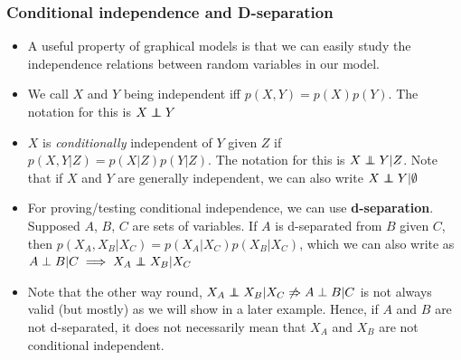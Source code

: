 \subsubsection{Conditional independence and D-separation}
\begin{itemize}
	\item A useful property of graphical models is that we can easily study the independence relations between random variables in our model. 
	\item We call $X$ and $Y$ being independent iff $p(X,Y)=p(X)p(Y)$. The notation for this is $X\independent Y$
	\item $X$ is \textit{conditionally} independent of $Y$ given $Z$ if $p(X,Y|Z)=p(X|Z)p(Y|Z)$. The notation for this is $X\independent Y|Z$. Note that if $X$ and $Y$ are generally independent, we can also write $X\independent Y|\emptyset$
	\item For proving/testing conditional independence, we can use \textbf{d-separation}. Supposed $A$, $B$, $C$ are sets of variables. If $A$ is d-separated from $B$ given $C$, then $p(X_A,X_B|X_C)=p(X_A|X_C)p(X_B|X_C)$, which we can also write as $A\perp B|C\implies X_A\independent X_B|X_C$ 
	\item Note that the other way round, $X_A\independent X_B|X_C\not\Rightarrow A\perp B|C $ is not always valid (but mostly) as we will show in a later example. Hence, if $A$ and $B$ are not d-separated, it does not necessarily mean that $X_A$ and $X_B$ are not conditional independent.
	

\end{itemize}
